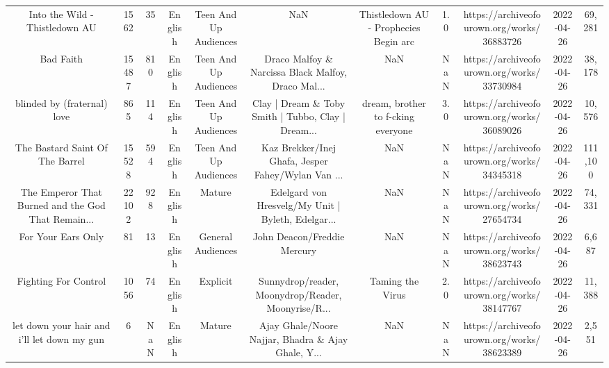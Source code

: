 \begin{table}[h!]
{\begin{tabular}{|c|c|c|c|c|c|c|c|c|c|c|}
                    Into the Wild - Thistledown AU &   1562 &    35 &  English & Teen And Up Audiences &                                                NaN &              Thistledown AU - Prophecies Begin arc &   1.0 & https://archiveofourown.org/works/36883726 & 2022-04-26 &    69,281 \\
                                         Bad Faith &  15487 &   810 &  English & Teen And Up Audiences & Draco Malfoy \& Narcissa Black Malfoy, Draco Mal... &                                                NaN &   NaN & https://archiveofourown.org/works/33730984 & 2022-04-26 &    38,178 \\
                       blinded by (fraternal) love &    865 &   114 &  English & Teen And Up Audiences & Clay | Dream \& Toby Smith | Tubbo, Clay | Dream... &                 dream, brother to f-cking everyone &   3.0 & https://archiveofourown.org/works/36089026 & 2022-04-26 &    10,576 \\
                   The Bastard Saint Of The Barrel &  15528 &   594 &  English & Teen And Up Audiences & Kaz Brekker/Inej Ghafa, Jesper Fahey/Wylan Van ... &                                                NaN &   NaN & https://archiveofourown.org/works/34345318 & 2022-04-26 &   111,100 \\
The Emperor That Burned and the God That Remain... &  22102 &   928 &  English &                Mature & Edelgard von Hresvelg/My Unit | Byleth, Edelgar... &                                                NaN &   NaN & https://archiveofourown.org/works/27654734 & 2022-04-26 &    74,331 \\
                                For Your Ears Only &     81 &    13 &  English &     General Audiences &                        John Deacon/Freddie Mercury &                                                NaN &   NaN & https://archiveofourown.org/works/38623743 & 2022-04-26 &     6,687 \\
                              Fighting For Control &   1056 &    74 &  English &              Explicit & Sunnydrop/reader, Moonydrop/Reader, Moonyrise/R... &                                   Taming the Virus &   2.0 & https://archiveofourown.org/works/38147767 & 2022-04-26 &    11,388 \\
       let down your hair and i'll let down my gun &      6 &   NaN &  English &                Mature & Ajay Ghale/Noore Najjar, Bhadra \& Ajay Ghale, Y... &                                                NaN &   NaN & https://archiveofourown.org/works/38623389 & 2022-04-26 &     2,551 \\

\end{tabular}}
\end{table}
